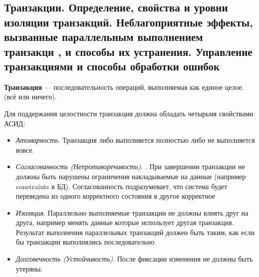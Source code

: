 \subsection{Транзакции. Определение, свойства и уровни изоляции транзакций. Неблагоприятные эффекты, вызванные параллельным выполнением транзакци , и способы их устранения. Управление транзакциями и способы обработки ошибок}

\textbf{Транзакция} --- последовательность операций, выполняемая как единое целое. (всё или ничего).

Для поддержания целостности транзакция должна обладать четырьмя свойствами АСИД:
\begin{itemize}
	\item \textit{Атомарность}. Транзакция либо выполняется полностью либо не выполняется вовсе.
	\item \textit{Согласованность (Непротиворечивость)}. . При завершении транзакции не должны быть нарушены ограничения накладываемые на данные (например constraints в БД). Согласованность подразумевает, что система будет переведена из одного корректного состояния в другое корректное
	\item \textit{Изоляция}. Параллельно выполняемые транзакции не должны влиять друг на друга,
	например менять данные которые использует другая транзакция. Результат выполнения параллельных транзакций должен быть таким, как если бы транзакции выполнялись последовательно.
	\item \textit{Долговечность (Устойчивость)}. После фиксации изменения не должны быть утеряны.
\end{itemize}


